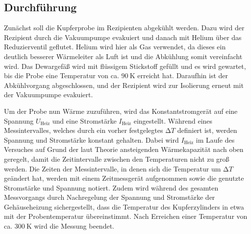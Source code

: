 \subsection{Durchführung}
\label{sec:durchführung}

Zunächst soll die Kupferprobe im Rezipienten abgekühlt werden.
Dazu wird der Rezipient durch die Vakuumpumpe evakuiert und danach mit Helium über das Reduzierventil geflutet.
Helium wird hier als Gas verwendet, da dieses ein deutlich besserer Wärmeleiter als Luft ist und die Abkühlung somit vereinfacht wird.
Das Dewargefäß wird mit flüssigem Stickstoff gefüllt und es wird gewartet, bis die Probe eine Temperatur von ca. $\SI{90}{\kelvin}$ erreicht hat.
Daraufhin ist der Abkühlvorgang abgeschlossen, und der Rezipient wird zur Isolierung erneut mit der Vakuumpumpe evakuiert.

Um der Probe nun Wärme zuzuführen, wird das Konstantstromgerät auf eine Spannung $U_{\text{Heiz}}$ und eine Stromstärke $I_{\text{Heiz}}$ eingestellt.
Während eines Messintervalles, welches durch ein vorher festgelegtes $\increment T$ definiert ist, werden Spannung und Stromstärke konstant gehalten.
Dabei wird $I_{\text{Heiz}}$ im Laufe des Versuches auf Grund der laut Theorie ansteigenden Wärmekapazität nach oben geregelt, damit die Zeitintervalle zwischen den Temperaturen nicht zu groß werden.
Die Zeiten der Messintervalle, in denen sich die Temperatur um $\increment T$ geändert hat, werden mit einem Zeitmessgerät aufgenommen sowie die genutzte Stromstärke und Spannung notiert.
Zudem wird während des gesamten Messvorgangs durch Nachregelung der Spannung und Stromstärke der Gehäuseheizung sichergestellt, dass die Temperatur des Kupferzylinders in etwa mit der Probentemperatur übereinstimmt.
Nach Erreichen einer Temperatur von ca. $\SI{300}{\kelvin}$ wird die Messung beendet.
